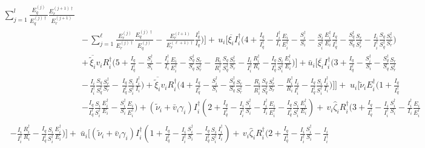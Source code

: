 \documentclass[a4paper]{article}
\newcommand{\dsum}{\displaystyle\sum}
\begin{document}
\begin{align}
{\dsum_{j=1}^{l}}\frac{E^{(j)}_q}{E^{(j)\dagger }_q}\frac{E^{(j+1)\dagger }_r}{E^{(j+1)}_r} \nonumber\\&-\, {\dsum_{j=1}^{\ell}}\frac{ E^{(j)}_r}{ E^{(j)\dagger }_r}\frac{E^{(j)\dagger }_q}{E^{(j)}_q} -\,\frac{E^{(l+1)}_r}{E^{(\ell+1)\dagger }_r}\frac{I^\dagger _q}{I_q} \Big)\Big] +\,u_i\Big[\overline{\xi_i} I^\dagger _i\Big(4+\frac{I_q}{I^\dagger _q}- \frac{I^\dagger_i}{I_i}\frac{E_i}{E^\dagger_i}-\frac{S^\dagger _i}{S_i}-\frac{S_i}{S^\dagger _i}\frac{E^\dagger _i}{E_i}\frac{I_q}{I^\dagger _q}-\frac{S^\dagger _q}{S_q}\frac{S_r}{S^\dagger _r}-\frac{I_i}{I^\dagger _i}\frac{S_q}{S^\dagger _q}\frac{S^\dagger _r}{S_r}\Big) \nonumber\\& +\, \overline{\widetilde\xi_i}v_iR^\dagger_i\Big(5 + \frac{I_q}{I^\dagger_q} - \frac{S^\dagger _i}{S_i} -\frac{I^\dagger_i}{I_i} \frac{E_i}{E^\dagger_i} -\frac{S^\dagger _q}{S_q} \frac{S_r}{S^\dagger _r}-\,\frac{R_i}{R^\dagger _i}\frac{S_q}{S^\dagger _q}\frac{S^\dagger _r}{S_r}  -\frac{I_i}{I^\dagger_i} \frac{R^\dagger_i}{R_i} - \frac{I_q}{I^\dagger _q}\frac{S_i}{S^\dagger_i} \frac{E^\dagger_i}{E_i} \Big)\Big] + \bar u_i \Big[\overline{\xi_i}I^\dagger_i\Big(3 + \frac{I_q}{I_q^\dagger} - \frac{S^\dagger _i}{S_i}  -\frac{S^\dagger _q}{S_q}\frac{S_r}{S^\dagger _r} \nonumber\\& -\,\frac{I_i}{I^\dagger _i}\frac{S_q}{S^\dagger _q}\frac{S^\dagger _r}{S_r}-\, \frac{I_q}{I_q^\dagger} \frac{S_i}{S_i^\dagger} \frac{I^\dagger_i}{I_i}\Big) + \overline{\widetilde\xi_i}v_iR^\dagger_i\Big(4 + \frac{I_q}{I_q^\dagger} - \frac{S^\dagger _i}{S_i}  -\frac{S^\dagger _q}{S_q}  \frac{S_r}{S^\dagger_r} -\frac{R_i}{R^\dagger _i}\frac{S_q}{S^\dagger _q}\frac{S^\dagger _r}{S_r} - \frac{R^\dagger_i}{R_i} \frac{I_i}{I^\dagger_i} - \frac{I_q}{I_q^\dagger} \frac{S_i}{S_i^\dagger} \frac{I^\dagger_i}{I_i} \Big)\Big]\Big] +\; u_i\Big[\widetilde\nu_iE^\dagger_i\Big(1 + \frac{I_q}{I^\dagger_q}\nonumber\\&-\frac{I_q}{I^\dagger_q}\frac{S_i}{S^\dagger_i}\frac{E^\dagger_i}{E_i} - \frac{S^\dagger_i}{S_i} \frac{E_i}{E^\dagger_i}\Big) + (\widetilde\nu_i + \bar v_i\gamma_i)I^\dagger _i\left(2 + \frac{I_q}{I^\dagger _q} - \frac{I_i}{I^\dagger _i} \frac{S^\dagger _i}{S_i} - \frac{I^\dagger_i}{I_i}\frac{E_i}{E^\dagger_i} - \frac{I_q}{I^\dagger _q} \frac{S_i}{S^\dagger _i}\frac{E^\dagger _i}{E_i}\right) +\, v_i\hat\zeta_iR^\dagger_i\Big(3 + \frac{I_q}{I^\dagger _q} - \frac{I_i}{I^\dagger _i} \frac{S^\dagger _i}{S_i}- \frac{I^\dagger_i}{I_i}\frac{E_i}{E^\dagger_i}\nonumber\end{align}\begin{align} \nonumber\\&  - \frac{I_i}{I^\dagger_i} \frac{R^\dagger_i}{R_i} - \frac{I_q}{I^\dagger _q} \frac{S_i}{S^\dagger _i}\frac{E^\dagger _i}{E_i}\Big)\Big]  +\; \bar u_i\Big[ (\widetilde\nu_i + \bar v_i\gamma_i)I^\dagger _i\left(1 + \frac{I_q}{I^\dagger _q} - \frac{I_i}{I^\dagger _i} \frac{S^\dagger _i}{S_i}  - \frac{I_q}{I^\dagger _q} \frac{S_i}{S^\dagger _i}\frac{I^\dagger _i}{I_i}\right)+\, v_i\hat\zeta_iR^\dagger_i\Big(2 + \frac{I_q}{I^\dagger _q} - \frac{I_i}{I^\dagger _i} \frac{S^\dagger _i}{S_i}    - \frac{I_i}{I^\dagger_i} 
\end{align}
\end{document}

